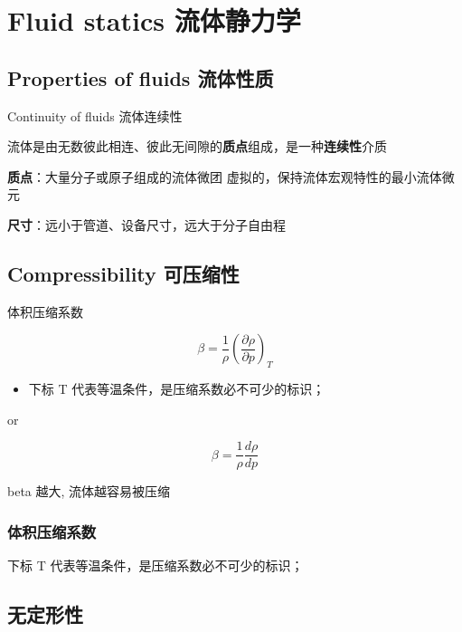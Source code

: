 \documentclass{book}
\DeclareRobustCommand{\bluebold}[1]{\textbf{\textcolor[rgb]{0.31,0.63,0.86}{#1}}}
\begin{document}
\tableofcontents
\clearpage


\chapter{Fluid statics 流体静力学}

\section{Properties of fluids 流体性质}

Continuity of fluids 流体连续性

流体是由无数彼此相连、彼此无间隙的\bluebold{质点}组成，是一种\bluebold{连续性}介质

\bluebold{质点}：大量分子或原子组成的流体微团
虚拟的，保持流体宏观特性的最小流体微元

\bluebold{尺寸}：远小于管道、设备尺寸，远大于分子自由程

\section{Compressibility 可压缩性}

体积压缩系数

\begin{equation}
\beta = \frac{1}{\rho} \left( \frac{\partial \rho}{\partial p} \right)_T
\label{eq:isothermal-compressibility}
\end{equation}

\begin{itemize}
    \item 下标 T 代表等温条件，是压缩系数必不可少的标识；
\end{itemize}

or

\begin{equation}
\beta = \frac{1}{\rho} \frac{d\rho}{dp}
\end{equation}

beta 越大, 流体越容易被压缩

\subsection{体积压缩系数}

下标 T 代表等温条件，是压缩系数必不可少的标识；

\section{无定形性}
\end{document}
